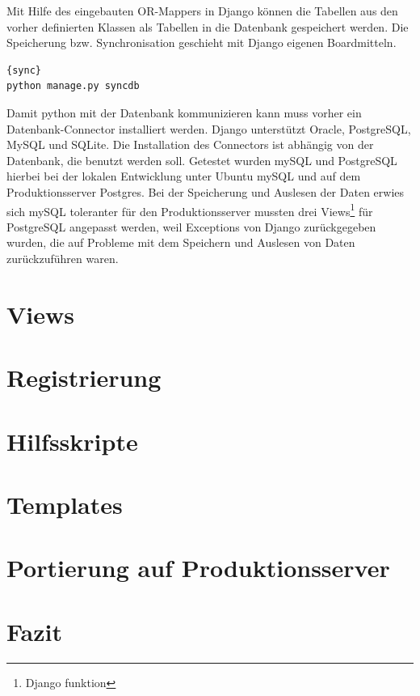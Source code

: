 \documentclass[titlepage, 12pt,a4paper]{scrartcl}
\begin{document}
Mit Hilfe des eingebauten OR-Mappers in Django können die Tabellen aus den
vorher definierten Klassen als Tabellen in die Datenbank gespeichert werden.
Die Speicherung bzw. Synchronisation geschieht mit Django eigenen Boardmitteln.

\begin{lstlisting}[caption=Datenbanksynchronisation]{sync}
python manage.py syncdb
\end{lstlisting}

Damit python mit der Datenbank kommunizieren kann muss vorher ein
Datenbank-Connector installiert werden. Django unterstützt Oracle, PostgreSQL,
MySQL und SQLite. Die Installation des Connectors ist abhängig von der
Datenbank, die benutzt werden soll. Getestet wurden mySQL und PostgreSQL
hierbei bei der lokalen Entwicklung unter Ubuntu mySQL und auf dem
Produktionsserver Postgres. Bei der Speicherung und Auslesen der Daten erwies
sich mySQL toleranter für den Produktionsserver mussten drei
Views\footnote{Django funktion} für PostgreSQL angepasst werden, weil
Exceptions von Django zurückgegeben wurden, die auf Probleme mit dem Speichern
und Auslesen von Daten zurückzuführen waren.



\section{Views}
\section{Registrierung}
\section{Hilfsskripte}
\section{Templates}
\section{Portierung auf Produktionsserver}
\section{Fazit}
\end{document}
